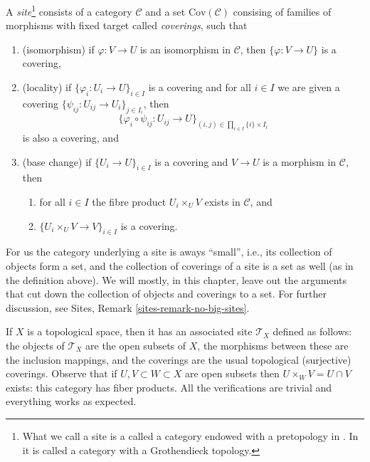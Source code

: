 \begin{definition}
\label{definition-site}
A {\it site}\footnote{What we call a site is a called a category endowed with
a pretopology in \cite[Expos\'e II, D\'efinition 1.3]{SGA4}.
In \cite{ArtinTopologies} it is called a category with a Grothendieck
topology.} consists of a category $\mathcal{C}$ and a set
$\text{Cov}(\mathcal{C})$ consising of families of morphisms with fixed target
called {\it coverings}, such that
\begin{enumerate}
\item (isomorphism) if $\varphi : V \to U$ is an isomorphism in $\mathcal{C}$,
then $\{\varphi : V \to U\}$ is a covering,
\item (locality) if $\{\varphi_i : U_i \to U\}_{i\in I}$ is a covering and
for all $i \in I$ we are given a covering
$\{\psi_{ij} : U_{ij} \to U_i \}_{j\in I_i}$, then
$$
\{
\varphi_i \circ \psi_{ij} : U_{ij} \to U
\}_{(i, j)\in \prod_{i\in I} \{i\} \times I_i}
$$
is also a covering, and
\item (base change) if $\{U_i \to U\}_{i\in I}$
is a covering and $V \to U$ is a morphism in $\mathcal{C}$, then
\begin{enumerate}
\item for all $i \in I$ the fibre product
$U_i \times_U V$ exists in $\mathcal{C}$, and
\item $\{U_i \times_U V \to V\}_{i\in I}$ is a covering.
\end{enumerate}
\end{enumerate}
\end{definition}

\noindent
For us the category underlying a site is aways ``small'', i.e., its
collection of objects form a set, and the collection of coverings of
a site is a set as well (as in the definition above). We will mostly,
in this chapter, leave out the arguments that cut down the collection
of objects and coverings to a set. For further discussion, see
Sites, Remark \ref{sites-remark-no-big-sites}.

\begin{example}
\label{example-site-topological-space}
If $X$ is a topological space, then it has an associated site $\mathcal{T}_X$
defined as follows: the objects of $\mathcal{T}_X$ are the open subsets of $X$,
the morphisms between these are the inclusion mappings, and the coverings are
the usual topological (surjective) coverings. Observe that if
$U, V \subset W \subset X$ are open subsets then $U \times_W V = U \cap V$
exists: this category has fiber products. All the verifications are trivial and
everything works as expected.
\end{example}




